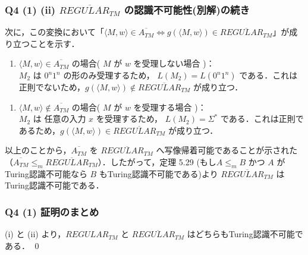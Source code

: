 \begin{frame}[fragile]
\frametitle{Q4 (1) \hspace{3mm} (ii) $\overline{REGULAR_{TM}}$ の認識不可能性(別解)の続き}

次に，この変換において「$\langle M, w \rangle \in \overline{A_{TM}} \Leftrightarrow g(\langle M, w \rangle) \in \overline{REGULAR_{TM}}$」が成り立つことを示す．

\begin{enumerate}
  \item[・] $\langle M, w \rangle \in \overline{A_{TM}}$ の場合( $M$ が $w$ を受理しない場合 )： \\
$M_{2}$ は $0^{n}1^{n}$ の形のみ受理するため， $L(M_{2}) = L(0^{n}1^{n})$ である．これは正則でないため，$g(\langle M, w \rangle) \notin \overline{REGULAR_{TM}}$ が成り立つ．
\end{enumerate}

\begin{enumerate}
  \item[・] $\langle M, w \rangle \notin \overline{A_{TM}}$ の場合( $M$ が $w$ を受理する場合 )： \\
$M_{2}$ は 任意の入力 $x$ を受理するため， $L(M_{2}) = \Sigma^{\ast}$ である．これは正則であるため，$g(\langle M, w \rangle) \in \overline{REGULAR_{TM}}$ が成り立つ．
\end{enumerate}

以上のことから，$\overline{A_{TM}}$ を $\overline{REGULAR_{TM}}$ へ写像帰着可能であることが示された（$\overline{A_{TM}} \le_{m} \overline{REGULAR_{TM}}$）．したがって，定理 5.29 (もし$A \le_{m} B$ かつ $A$ がTuring認識不可能なら $B$ もTuring認識不可能である)より $\overline{REGULAR_{TM}}$ はTuring認識不可能である． \\

\end{frame}



\begin{frame}[fragile]
\frametitle{Q4 (1) 証明のまとめ}

(i) と (ii) より，$REGULAR_{TM}$ と $\overline{REGULAR_{TM}}$ はどちらもTuring認識不可能である．
\hfill \qed

\end{frame}






